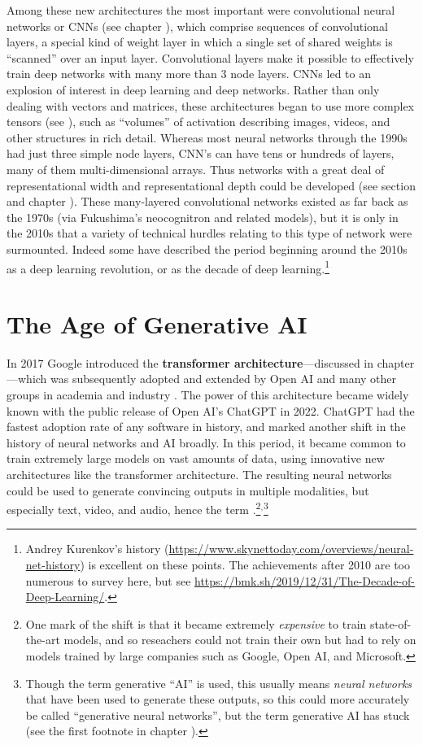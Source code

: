 Among these new architectures the most important were convolutional neural networks or CNNs (see   chapter ), which comprise sequences of convolutional layers, a special kind of weight layer in which a single set of shared weights is “scanned” over an input layer. Convolutional layers make it possible to effectively train deep networks with many more than 3 node layers.  CNNs led to an explosion of interest in deep learning and deep networks. Rather than only dealing with vectors and matrices, these architectures began to use more complex tensors (see ), such as ``volumes'' of activation describing images, videos, and other structures in rich detail.  Whereas most neural networks through the 1990s had just three simple node layers, CNN's can have tens or hundreds of layers, many of them multi-dimensional arrays. Thus networks with  a great deal of representational width and representational depth could be developed (see section  and chapter ). These many-layered convolutional networks existed as far back as the 1970s (via Fukushima's neocognitron and related models), but it is only in the 2010s  that a variety of technical hurdles relating to this type of network were surmounted. Indeed some have described the period beginning around the 2010s as a deep learning revolution, or as the decade of deep learning.\footnote{Andrey Kurenkov's history (\url{https://www.skynettoday.com/overviews/neural-net-history}) is excellent on these points. The achievements after 2010 are too numerous to survey here, but see \url{https://bmk.sh/2019/12/31/The-Decade-of-Deep-Learning/}.}  

\section{The Age of Generative AI}\label{age_generative_ai}

In 2017 Google introduced the \textbf{transformer architecture}---discussed in chapter ---which was subsequently adopted and extended by Open AI and many other groups in academia and industry \cite{vaswani2017attention}. The power of this architecture became widely known with the public release of Open AI's ChatGPT in 2022. ChatGPT had the fastest adoption rate of any software in history, and marked another shift in the history of neural networks and AI broadly. In this period, it became common to train extremely large models on vast amounts of data, using innovative new architectures like the transformer architecture. The resulting neural networks could be used to generate convincing outputs in multiple modalities, but especially text, video, and audio, hence the term .\footnote{One mark of the shift is that it became extremely \emph{expensive} to train state-of-the-art models, and so reseachers could not train their own but had to rely on models trained by large companies such as Google, Open AI, and Microsoft.}$^,$\footnote{Though the term generative ``AI'' is used, this usually means \emph{neural networks} that have been used to generate these outputs, so this could more accurately be called ``generative neural networks'', but the term generative AI has stuck (see the first footnote in chapter ).}


